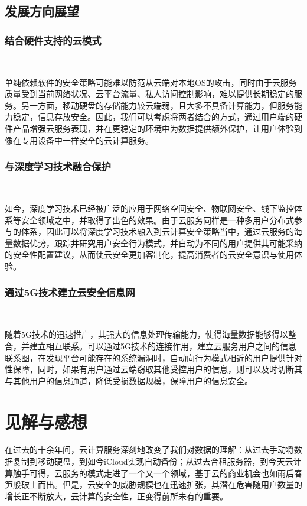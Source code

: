 \documentclass[a4paper, 12pt, conference]{ieeeconf}      %
\begin{document}
\subsection{发展方向展望}
\subsubsection{结合硬件支持的云模式}
\ 

单纯依赖软件的安全策略可能难以防范从云端对本地OS的攻击，同时由于云服务质量受到当前网络状况、云平台流量、私人访问控制影响，难以提供长期稳定的服务。另一方面，移动硬盘的存储能力较云端弱，且大多不具备计算能力，但服务能力稳定，信息存放安全。因此，我们可以考虑将两者结合的方式，通过用户端的硬件产品增强云服务表现，并在更稳定的环境中为数据提供额外保护，让用户体验到像在专用设备中一样安全的云计算服务。

\subsubsection{与深度学习技术融合保护}
\ 

如今，深度学习技术已经被广泛的应用于网络空间安全、物联网安全、线下监控体系等安全领域之中，并取得了出色的效果。由于云服务同样是一种多用户分布式参与的体系，因此可以将深度学习技术融入到云计算安全策略当中，通过云服务的海量数据优势，跟踪并研究用户安全行为模式，并自动为不同的用户提供其可能采纳的安全性配置建议，从而使云安全更加客制化，提高消费者的云安全意识与使用体验。

\subsubsection{通过5G技术建立云安全信息网}
\ 

随着5G技术的迅速推广，其强大的信息处理传输能力，使得海量数据能够得以整合，并建立相互联系。可以通过5G技术的连接作用，建立云服务用户之间的信息联系图，在发现平台可能存在的系统漏洞时，自动向行为模式相近的用户提供针对性保障，同时，如果有用户通过云端窃取其他受控用户的信息，则可以及时切断其与其他用户的信息通道，降低受损数据规模，保障用户的信息安全。


\section{见解与感想}

在过去的十余年间，云计算服务深刻地改变了我们对数据的理解：从过去手动将数据复制到移动硬盘，到如今iCloud实现自动备份；从过去合租服务器，到今天云计算触手可得，云服务的模式走进了一个又一个领域，基于云的商业机会也如雨后春笋般破土而出。但是，云安全的威胁规模也在迅速扩张，其潜在危害随用户数量的增长正不断放大，云计算的安全性，正变得前所未有的重要。
\end{document}
